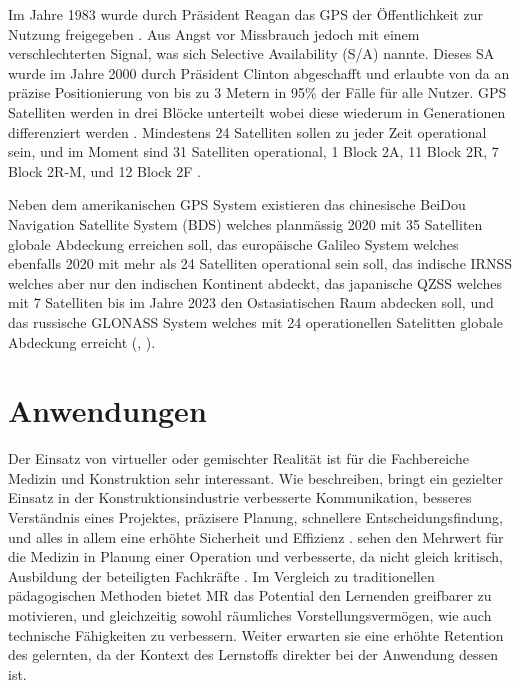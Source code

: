\documentclass[a4paper]{scrreprt}
\begin{document}
Im Jahre 1983 wurde durch Präsident Reagan das GPS der Öffentlichkeit zur Nutzung freigegeben \parencite{Brustein2014}. Aus Angst vor Missbrauch jedoch mit einem verschlechterten Signal, was sich Selective Availability (S/A) nannte. Dieses SA wurde im Jahre 2000 durch Präsident Clinton abgeschafft und erlaubte von da an präzise Positionierung von bis zu 3 Metern in 95\% der Fälle für alle Nutzer. GPS Satelliten werden in drei Blöcke unterteilt wobei diese wiederum in Generationen differenziert werden \parencite{DoDGPS2008}. Mindestens 24 Satelliten sollen zu jeder Zeit operational sein, und im Moment sind 31 Satelliten operational, 1 Block 2A, 11 Block 2R, 7 Block 2R-M, und 12 Block 2F \parencite{NCOGPS2018}.

Neben dem amerikanischen GPS System existieren das chinesische BeiDou Navigation Satellite System (BDS) welches planmässig 2020 mit 35 Satelliten globale Abdeckung erreichen soll, das europäische Galileo System welches ebenfalls 2020 mit mehr als 24 Satelliten operational sein soll, das indische IRNSS welches aber nur den indischen Kontinent abdeckt, das japanische QZSS welches mit 7 Satelliten bis im Jahre 2023 den Ostasiatischen Raum abdecken soll, und das russische GLONASS System welches mit 24 operationellen Satelitten globale Abdeckung erreicht (\cite{NCOGPS2017}, \cite{IACPNTGLONASS2018}).

\section{Anwendungen}

Der Einsatz von virtueller oder gemischter Realität ist für die Fachbereiche Medizin und Konstruktion sehr interessant. Wie \citeauthor{Piroozfar2018} beschreiben, bringt ein gezielter Einsatz in der Konstruktionsindustrie verbesserte Kommunikation, besseres Verständnis eines Projektes, präzisere Planung, schnellere Entscheidungsfindung, und alles in allem eine erhöhte Sicherheit und Effizienz \parencite{Piroozfar2018}. \citeauthor{Pelargos2017} sehen den Mehrwert für die Medizin in Planung einer Operation und verbesserte, da nicht gleich kritisch, Ausbildung der beteiligten Fachkräfte \parencite{Pelargos2017}. Im Vergleich zu traditionellen pädagogischen Methoden bietet MR das Potential den Lernenden greifbarer zu motivieren, und gleichzeitig sowohl räumliches Vorstellungsvermögen, wie auch technische Fähigkeiten zu verbessern. Weiter erwarten sie eine erhöhte Retention des gelernten, da der Kontext des Lernstoffs direkter bei der Anwendung dessen ist.
\end{document}
